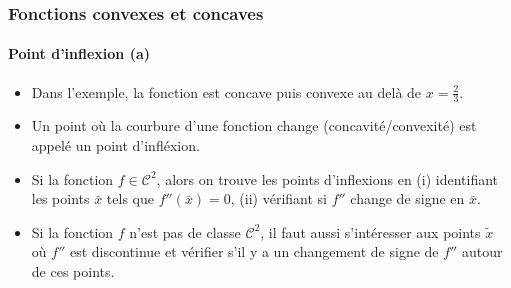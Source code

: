 \documentclass[10pt,notheorems]{beamer}
\theoremstyle{plain}
\theoremstyle{definition} %
\begin{document}
\begin{frame}
\begin{columns}[onlytextwidth]
\begin{column}{.5\textwidth}
\begin{center}
      \end{center}
    \end{column}
  \end{columns}
\end{frame}



\begin{frame}
  \frametitle{Fonctions convexes et concaves}
  \framesubtitle{Point d'inflexion (a)}
  \hypertarget{slide_fonctions_convexes_11}{}

  \begin{itemize}

  \item Dans l'exemple, la fonction est concave puis convexe au delà de $x=\frac{2}{3}$.\newline

  \item Un point où la courbure d'une fonction change (concavité/convexité) est appelé un point d'infléxion.\newline

  \item Si la fonction $f\in\mathcal C^2$, alors on trouve les points d'inflexions en (i) identifiant les points $\bar x$ tels que $f''(\bar x)=0$, (ii) vérifiant si $f''$ change de signe en $\bar x$.\newline

  \item[\dbend] Si la fonction $f$ n'est pas de classe $\mathcal C^2$, il faut aussi s'intéresser aux points $\tilde x$ où $f''$ est discontinue et vérifier s'il y a un changement de signe de $f''$ autour de ces points.

  \end{itemize}

\end{frame}
\end{document}
